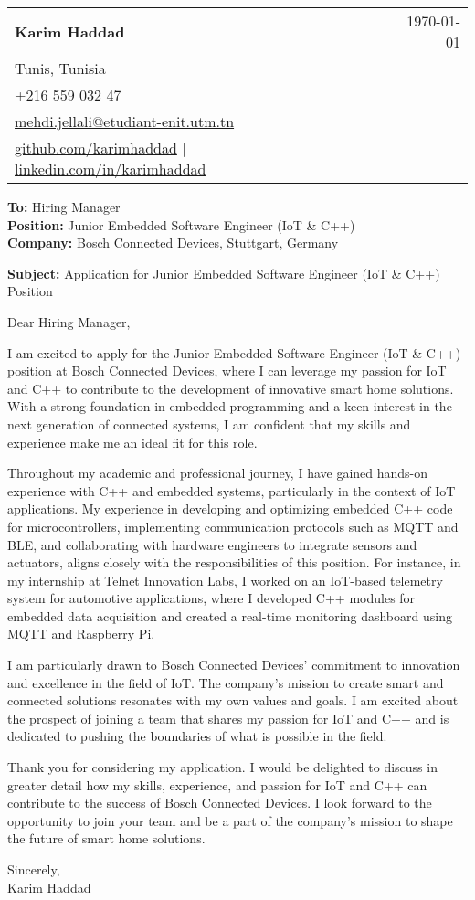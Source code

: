 \documentclass[letterpaper,11pt]{article}
\makeatletter
\newcommand{\letterHeading}[5]{
    \begin{tabular*}{\textwidth}{l@{\extracolsep{\fill}}r}
    \textbf{\Large #1} & #5 \\  %
    #2 & \\
    #3 & \\
    #4 & \\
    \end{tabular*}
    \vspace{15pt}
}
\newcommand{\letterRecipient}[3]{
    \textbf{\large To:} #1 \\
    \textbf{\large Position:} #2 \\
    \textbf{\large Company:} #3 \\
    \vspace{12pt}
}
\newcommand{\letterSubject}[1]{
    \textbf{\large Subject:} #1 \\
    \vspace{15pt}
}
\makeatother
\begin{document}
    \letterHeading
    {Karim Haddad}
    {Tunis, Tunisia}
    {+216 559 032 47 \\ \href{mailto:mehdi.jellali@etudiant-enit.utm.tn}{mehdi.jellali@etudiant-enit.utm.tn}}
    {\href{https://github.com/karimhaddad}{github.com/karimhaddad} $|$ \href{https://www.linkedin.com/in/karimhaddad}{linkedin.com/in/karimhaddad}}
    {\today}

    \letterRecipient
    {Hiring Manager}
    {Junior Embedded Software Engineer (IoT & C++)}
    {Bosch Connected Devices, Stuttgart, Germany}

    \letterSubject{Application for Junior Embedded Software Engineer (IoT & C++) Position}

    Dear Hiring Manager,

    I am excited to apply for the Junior Embedded Software Engineer (IoT & C++) position at Bosch Connected Devices, where I can leverage my passion for IoT and C++ to contribute to the development of innovative smart home solutions. With a strong foundation in embedded programming and a keen interest in the next generation of connected systems, I am confident that my skills and experience make me an ideal fit for this role.

    Throughout my academic and professional journey, I have gained hands-on experience with C++ and embedded systems, particularly in the context of IoT applications. My experience in developing and optimizing embedded C++ code for microcontrollers, implementing communication protocols such as MQTT and BLE, and collaborating with hardware engineers to integrate sensors and actuators, aligns closely with the responsibilities of this position. For instance, in my internship at Telnet Innovation Labs, I worked on an IoT-based telemetry system for automotive applications, where I developed C++ modules for embedded data acquisition and created a real-time monitoring dashboard using MQTT and Raspberry Pi.

    I am particularly drawn to Bosch Connected Devices' commitment to innovation and excellence in the field of IoT. The company's mission to create smart and connected solutions resonates with my own values and goals. I am excited about the prospect of joining a team that shares my passion for IoT and C++ and is dedicated to pushing the boundaries of what is possible in the field.

    Thank you for considering my application. I would be delighted to discuss in greater detail how my skills, experience, and passion for IoT and C++ can contribute to the success of Bosch Connected Devices. I look forward to the opportunity to join your team and be a part of the company's mission to shape the future of smart home solutions.

    Sincerely,\\[12pt]

    Karim Haddad
\end{document}
